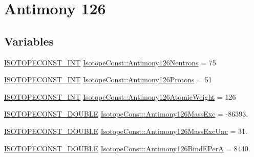 \hypertarget{group___isotope_const-_antimony-_sb126}{}\section{Antimony 126}
\label{group___isotope_const-_antimony-_sb126}
\subsection*{Variables}
\begin{DoxyCompactItemize}
\item 
\mbox{\hyperlink{group___isotope_const-_macros_ga5f18360b3e99483a35c32d789e62621c}{I\+S\+O\+T\+O\+P\+E\+C\+O\+N\+S\+T\+\_\+\+I\+NT}} \mbox{\hyperlink{group___isotope_const-_antimony-_sb126_gac0e9353e176bbfdf743afb28af65f043}{Isotope\+Const\+::\+Antimony126\+Neutrons}} = 75
\item 
\mbox{\hyperlink{group___isotope_const-_macros_ga5f18360b3e99483a35c32d789e62621c}{I\+S\+O\+T\+O\+P\+E\+C\+O\+N\+S\+T\+\_\+\+I\+NT}} \mbox{\hyperlink{group___isotope_const-_antimony-_sb126_gaa0b935f35826832d19cf68b9bb60d9fb}{Isotope\+Const\+::\+Antimony126\+Protons}} = 51
\item 
\mbox{\hyperlink{group___isotope_const-_macros_ga5f18360b3e99483a35c32d789e62621c}{I\+S\+O\+T\+O\+P\+E\+C\+O\+N\+S\+T\+\_\+\+I\+NT}} \mbox{\hyperlink{group___isotope_const-_antimony-_sb126_ga68f0eb7bffb7a7c7540ca603835f7696}{Isotope\+Const\+::\+Antimony126\+Atomic\+Weight}} = 126
\item 
\mbox{\hyperlink{group___isotope_const-_macros_ga8f45a7272ce02c0b4c65c44636ed719a}{I\+S\+O\+T\+O\+P\+E\+C\+O\+N\+S\+T\+\_\+\+D\+O\+U\+B\+LE}} \mbox{\hyperlink{group___isotope_const-_antimony-_sb126_ga5f8c636a903589636ff0644ad1403d25}{Isotope\+Const\+::\+Antimony126\+Mass\+Exc}} = -\/86393.
\item 
\mbox{\hyperlink{group___isotope_const-_macros_ga8f45a7272ce02c0b4c65c44636ed719a}{I\+S\+O\+T\+O\+P\+E\+C\+O\+N\+S\+T\+\_\+\+D\+O\+U\+B\+LE}} \mbox{\hyperlink{group___isotope_const-_antimony-_sb126_ga7728bad2618ed23a355b226253c4b12b}{Isotope\+Const\+::\+Antimony126\+Mass\+Exc\+Unc}} = 31.
\item 
\mbox{\hyperlink{group___isotope_const-_macros_ga8f45a7272ce02c0b4c65c44636ed719a}{I\+S\+O\+T\+O\+P\+E\+C\+O\+N\+S\+T\+\_\+\+D\+O\+U\+B\+LE}} \mbox{\hyperlink{group___isotope_const-_antimony-_sb126_ga79788885792e5a7095d8b5f3063ce148}{Isotope\+Const\+::\+Antimony126\+Bind\+E\+PerA}} = 8440.
\item 

\end{DoxyCompactItemize}
